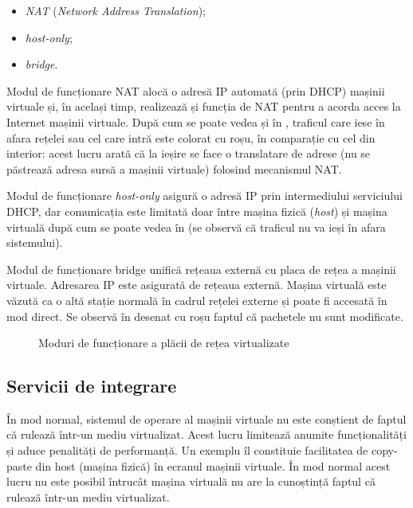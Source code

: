 \begin{itemize}
  \item \textit{NAT} (\textit{Network Address Translation});
  \item \textit{host-only};
  \item \textit{bridge}.
\end{itemize}

Modul de funcționare NAT alocă o adresă IP automată (prin DHCP) mașinii virtuale și, în
același timp, realizează și funcția de NAT pentru a acorda acces la Internet
mașinii virtuale. După cum se poate vedea și în
, traficul care iese în afara rețelei sau cel
care intră este colorat cu roșu, în comparație cu cel din interior: acest lucru
arată că la ieșire se face o translatare de adrese (nu se
păstrează adresa sursă a mașinii virtuale) folosind mecanismul NAT.

Modul de funcționare \textit{host-only} asigură o adresă IP prin intermediului
serviciului DHCP, dar comunicația este limitată doar între mașina fizică (\textit{host})
și mașina virtuală după cum se poate vedea în 
(se observă că traficul nu va ieși în afara sistemului).

Modul de funcționare bridge unifică rețeaua externă cu placa de rețea a mașinii
virtuale. Adresarea IP este asigurată de rețeaua externă. Mașina virtuală este
văzută ca o altă stație normală în cadrul rețelei externe și poate fi accesată
în mod direct. Se observă în  desenat cu roșu
faptul că pachetele nu sunt modificate.

\begin{figure}[htbp]
  \centering
  \def\svgwidth{\columnwidth}
  
  \caption{Moduri de funcționare a plăcii de rețea virtualizate}
  \label{fig:vm:net}
\end{figure}

\subsection{Servicii de integrare}
\label{sec:vm:ops:services}

În mod normal, sistemul de operare al mașinii virtuale nu este conștient de
faptul că rulează într-un mediu virtualizat. Acest lucru limitează anumite
funcționalități și aduce penalități de performanță. Un exemplu îl constituie
facilitatea de copy-paste din host (mașina fizică) în ecranul mașinii
virtuale. În mod normal acest lucru nu este posibil întrucât mașina virtuală nu
are la cunoștință faptul că rulează într-un mediu virtualizat.

